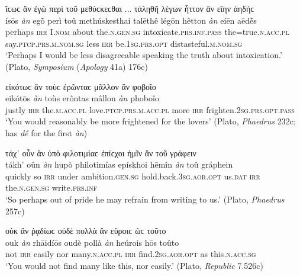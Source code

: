 \begin{exe}
\ex ἴϲωϲ ἂν ἐγὼ περὶ τοῦ μεθύϲκεϲθαι ... τἀληθῆ λέγων ἧττον ἂν εἴην ἀηδήϲ\\
\gll ísōs \emph{àn} egṑ perì toû methúskesthai talēthê légōn hêtton \emph{àn} eíēn aēdḗs\\
perhaps \textsc{irr} I.\textsc{nom} about the.\textsc{n.gen.sg} intoxicate.\textsc{prs.inf.pass} the=true.\textsc{n.acc.pl} say.\textsc{ptcp.prs.m.nom.sg} less \textsc{irr} be.\textsc{1sg.prs.opt} distasteful.\textsc{m.nom.sg}\\
\trans `Perhaps I would be less disagreeable speaking the truth about intoxication.' (Plato, \textit{Symposium} (\textit{Apology} 41a) 176c)
\label{multian60}
\end{exe}

\begin{exe}
\ex εἰκότωϲ ἂν τοὺϲ ἐρῶνταϲ μᾶλλον ἂν φοβοῖο\\
\gll eikótōs \emph{àn} toùs erôntas mâllon \emph{àn} phoboîo\\
justly \textsc{irr} the.\textsc{m.acc.pl} love.\textsc{ptcp.prs.m.acc.pl} more \textsc{irr} frighten.\textsc{2sg.prs.opt.pass}\\
\trans `You would reasonably be more frightened for the lovers' (Plato, \textit{Phaedrus} 232c; \citealp[7]{Schanz1882} has \textit{dḗ} for the first \textit{àn})
\label{multian61}
\end{exe}

\begin{exe}
\ex τάχ᾽ οὖν ἂν ὑπὸ φιλοτιμίαϲ ἐπίϲχοι ἡμῖν ἂν τοῦ γράφειν\\
\gll tákh' oûn \emph{àn} hupò philotimías epískhoi hēmîn \emph{àn} toû gráphein\\
quickly so \textsc{irr} under ambition.\textsc{gen.sg} hold.back.\textsc{3sg.aor.opt} us.\textsc{dat} \textsc{irr} the.\textsc{n.gen.sg} write.\textsc{prs.inf}\\
\trans `So perhaps out of pride he may refrain from writing to us.' (Plato, \textit{Phaedrus} 257c)
\label{multian62}
\end{exe}

\begin{exe}
\ex οὐκ ἂν ῥᾳδίωϲ οὐδὲ πολλὰ ἂν εὕροιϲ ὡϲ τοῦτο\\
\gll ouk \emph{àn} rhāidíōs oudè pollà \emph{àn} heúrois hōs toûto\\
not \textsc{irr} easily nor many.\textsc{n.acc.pl} \textsc{irr} find.\textsc{2sg.aor.opt} as this.\textsc{n.acc.sg}\\
\trans `You would not find many like this, nor easily.' (Plato, \textit{Republic} 7.526c)
\label{multian63}
\end{exe}

